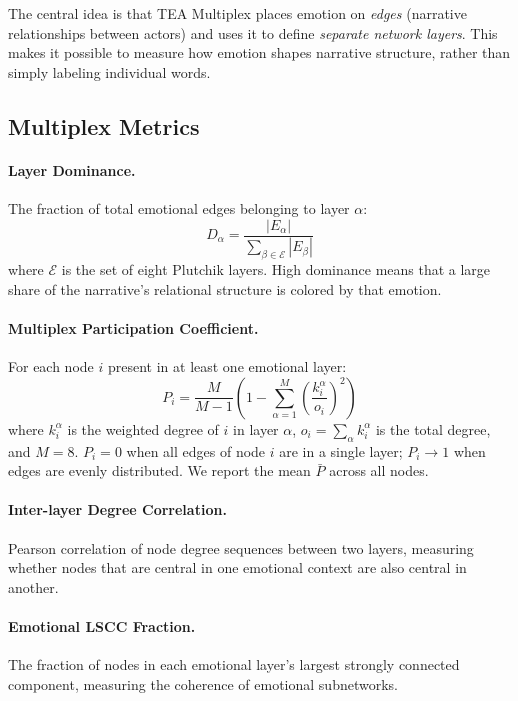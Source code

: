 \documentclass[11pt,a4paper]{article}
\begin{document}
The central idea is that TEA Multiplex places emotion on \textit{edges} (narrative relationships between actors) and uses it to define \textit{separate network layers}.  This makes it possible to measure how emotion shapes narrative structure, rather than simply labeling individual words.


\subsection{Multiplex Metrics}

\paragraph{Layer Dominance.} The fraction of total emotional edges belonging to layer $\alpha$:
\begin{equation}
    D_\alpha = \frac{|E_\alpha|}{\sum_{\beta \in \mathcal{E}} |E_\beta|}
\end{equation}
where $\mathcal{E}$ is the set of eight Plutchik layers.  High dominance means that a large share of the narrative's relational structure is colored by that emotion.

\paragraph{Multiplex Participation Coefficient.}  For each node $i$ present in at least one emotional layer:
\begin{equation}
    P_i = \frac{M}{M-1} \left(1 - \sum_{\alpha=1}^{M} \left(\frac{k_i^\alpha}{o_i}\right)^2 \right)
\end{equation}
where $k_i^\alpha$ is the weighted degree of $i$ in layer $\alpha$, $o_i = \sum_\alpha k_i^\alpha$ is the total degree, and $M=8$.  $P_i = 0$ when all edges of node $i$ are in a single layer; $P_i \to 1$ when edges are evenly distributed.  We report the mean $\bar{P}$ across all nodes.

\paragraph{Inter-layer Degree Correlation.} Pearson correlation of node degree sequences between two layers, measuring whether nodes that are central in one emotional context are also central in another.

\paragraph{Emotional LSCC Fraction.}  The fraction of nodes in each emotional layer's largest strongly connected component, measuring the coherence of emotional subnetworks.
\end{document}
